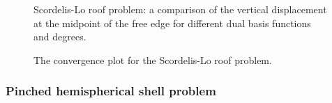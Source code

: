 \begin{figure}[h]
	\centering
	\captionsetup[subfigure]{font = footnotesize}
	\begin{subfigure}[b]{.32\textwidth}
		\centering
		
		\caption{}
	\end{subfigure}
	\begin{subfigure}[b]{.32\textwidth}
		\centering
		
		\caption{}
	\end{subfigure}
	\begin{subfigure}[b]{.32\textwidth}
		\centering
		
		\caption{}
	\end{subfigure}
	\caption{Scordelis-Lo roof problem: a comparison of the vertical displacement at the midpoint of the free edge for different dual basis functions and degrees.}\label{fig:scordelis_displacement}
\end{figure}

\begin{figure}[h]
	\center
	
	\caption{The convergence plot for the Scordelis-Lo roof problem.}\label{fig:convergence_scordelis}
\end{figure}
\FloatBarrier
\subsubsection{Pinched hemispherical shell problem}

